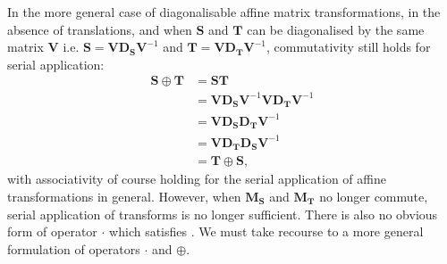        In the more general case of diagonalisable affine matrix transformations, in the absence of translations, and when $\mathbf{S}$ and $\mathbf{T}$ can be diagonalised by the same matrix $\mathbf{V}$ i.e. $\mathbf{S} = \mathbf{VD_SV}^{-1}$ and $\mathbf{T} = \mathbf{VD_TV}^{-1}$, commutativity still holds for serial application:
            \begin{equation}
                \begin{split}
                   \mathbf{S} \oplus \mathbf{T} &= \mathbf{ST} \\
                                                 &= \mathbf{VD_SV}^{-1}\mathbf{VD_TV}^{-1} \\
                                                 &= \mathbf{VD_SD_TV}^{-1} \\
                                                 &= \mathbf{VD_TD_SV}^{-1} \\
                                                 &= \mathbf{T} \oplus \mathbf{S},
                \end{split}
            \end{equation}
            with associativity of course holding for the serial application of affine transformations in general. However, when $\mathbf{M_S}$ and $\mathbf{M_T}$ no longer commute, serial application of transforms is no longer sufficient. There is also no obvious form of operator $\cdot$ which satisfies . We must take recourse to a more general formulation of operators $\cdot$ and $\oplus$.
    
